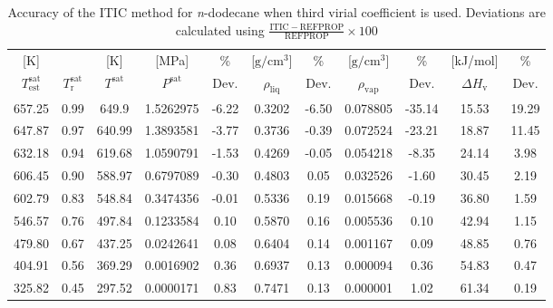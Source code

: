 \documentclass[%
 aip,
 jcp,
 sd,%
 amsmath,amssymb,
]{revtex4-1}
\begin{document}
\begin{table*}[]
\centering
\caption{Accuracy of the ITIC method for \textit{n}-dodecane when third virial coefficient is used. Deviations are calculated using $\frac{\mathrm{ITIC - REFPROP}}{\mathrm{REFPROP}} \times 100$}
\label{tab:NIST-VAL-C12-FTT}
\begin{tabular}{ccccccccccc}
\hline
{[}K{]}&  & {[}K{]} &	 {[}MPa{]} &	 \% 	& {[}$\mathrm{g/cm^3}${]} & \% & {[}$\mathrm{g/cm^3}${]} & \% 	& {[}kJ/mol{]} & \% \\
$T_\mathrm{est}^{\mathrm{sat}}$ & $T_\mathrm{r}^{\mathrm{sat}}$ & $T^{\mathrm{sat}}$ & $P^{\mathrm{sat}}$ & Dev. & $\rho_{\mathrm{liq}}$ &	 Dev. & $\rho_{\mathrm{vap}}$ & Dev. & $\Delta H_{\mathrm{v}}$ & Dev. \\
\hline
657.25 & 0.99 & 649.9  & 1.5262975 & -6.22 & 0.3202 & -6.50 & 0.078805 & -35.14 & 15.53 & 19.29 \\
647.87 & 0.97 & 640.99 & 1.3893581 & -3.77 & 0.3736 & -0.39 & 0.072524 & -23.21 & 18.87 & 11.45 \\
632.18 & 0.94 & 619.68 & 1.0590791 & -1.53 & 0.4269 & -0.05 & 0.054218 & -8.35  & 24.14 & 3.98  \\
606.45 & 0.90 & 588.97 & 0.6797089 & -0.30 & 0.4803 & 0.05  & 0.032526 & -1.60  & 30.45 & 2.19  \\
602.79 & 0.83 & 548.84 & 0.3474356 & -0.01 & 0.5336 & 0.19  & 0.015668 & -0.19  & 36.80 & 1.59  \\
546.57 & 0.76 & 497.84 & 0.1233584 & 0.10  & 0.5870 & 0.16  & 0.005536 & 0.10   & 42.94 & 1.15  \\
479.80 & 0.67 & 437.25 & 0.0242641 & 0.08  & 0.6404 & 0.14  & 0.001167 & 0.09   & 48.85 & 0.76  \\
404.91 & 0.56 & 369.29 & 0.0016902 & 0.36  & 0.6937 & 0.13  & 0.000094 & 0.36   & 54.83 & 0.47  \\
325.82 & 0.45 & 297.52 & 0.0000171 & 0.83  & 0.7471 & 0.13  & 0.000001 & 1.02   & 61.34 & 0.19  \\	
\hline		
\end{tabular}

\end{table*}
\end{document}

